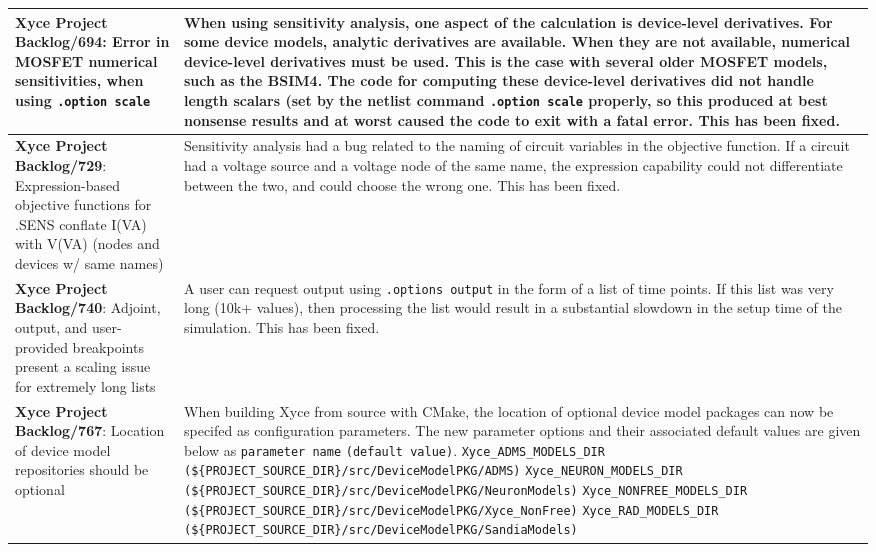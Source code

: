 {\begin{longtable}[h] {>{\raggedright\small}m{2in}|>{\raggedright\let\\\tabularnewline\small}m{3.5in}}
\textbf{Xyce Project Backlog/694}: 
Error in MOSFET numerical sensitivities, when using \texttt{.option scale}
  & When using sensitivity analysis, one aspect of the calculation is device-level derivatives.  For some device models, analytic derivatives are available.  When they are not available, numerical device-level derivatives must be used.  This is the case with several older MOSFET models, such as the BSIM4.  The code for computing these device-level derivatives did not handle length scalars (set by the netlist command \texttt{.option scale} properly, so this produced at best nonsense results and at worst caused the code to exit with a fatal error.  This has been fixed. \\ \hline

\textbf{Xyce Project Backlog/729}: 
Expression-based objective functions for .SENS conflate I(VA) with V(VA) (nodes and devices w/ same names)
& Sensitivity analysis had a bug related to the naming of circuit variables in the objective function.
If a circuit had a voltage source and a voltage node of the same name, the expression capability could not differentiate between the two, and could choose the wrong one.  This has been fixed. \\ \hline

\textbf{Xyce Project Backlog/740}: Adjoint, output, and user-provided breakpoints present a scaling issue for
extremely long lists & A user can request output using \texttt{.options output}
in the form of a list of time points.  If this list was very long (10k+ values),
then processing the list would result in a substantial slowdown in the setup time of the 
simulation.  This has been fixed. \\ \hline

\textbf{Xyce Project Backlog/767}: Location of device model repositories 
should be optional & When building Xyce from source with CMake, the 
location of optional device model packages can now be specifed as 
configuration parameters. The new parameter options and their 
associated default values are given below as \texttt{parameter name} 
\texttt{(default value)}. \newline
\texttt{Xyce\_ADMS\_MODELS\_DIR} \texttt{(\$\{PROJECT\_SOURCE\_DIR\}/src/DeviceModelPKG/ADMS)} \newline
\texttt{Xyce\_NEURON\_MODELS\_DIR} \texttt{(\$\{PROJECT\_SOURCE\_DIR\}/src/DeviceModelPKG/NeuronModels)} \newline
\texttt{Xyce\_NONFREE\_MODELS\_DIR} \texttt{(\$\{PROJECT\_SOURCE\_DIR\}/src/DeviceModelPKG/Xyce\_NonFree)} \newline
\texttt{Xyce\_RAD\_MODELS\_DIR} \texttt{(\$\{PROJECT\_SOURCE\_DIR\}/src/DeviceModelPKG/SandiaModels)} \newline
\\ \hline

\end{longtable}
}
